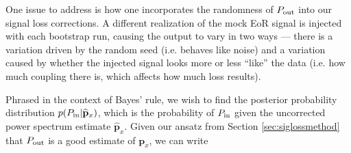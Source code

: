 \documentclass[preprint2,numberedappendix,tighten]{aastex6}  %
\newcommand{\p}{\mathbf{p}}
\newcommand{\phat}{\widehat{\mathbf{p}}}
\newcommand{\acl}[1]{{\color{red} \textbf{[ACL:  #1]}}}
\newcommand{\dcj}[1]{{\color{orange} \textbf{[DCJ: #1]}}}
\begin{document}

One issue to address is how one incorporates the randomness of $P_{\rm out}$ into our signal loss corrections. A different realization of the mock EoR signal is injected with each bootstrap run, causing the output to vary in two ways ---  there is a variation driven by the random seed (i.e. behaves like noise) and a variation caused by whether the injected signal looks more or less ``like'' the data (i.e. how much coupling there is, which affects how much loss results).

Phrased in the context of Bayes' rule, we wish to find the posterior probability distribution $p(P_{\rm in} | 
\phat_{x})$, which is the probability of $P_{\rm in}$ given the uncorrected power spectrum estimate $\phat_{x}$. Given our ansatz from Section \ref{sec:siglossmethod} that $P_{\rm out}$ is a good estimate of $\p_{x}$, we can write
\end{document}
